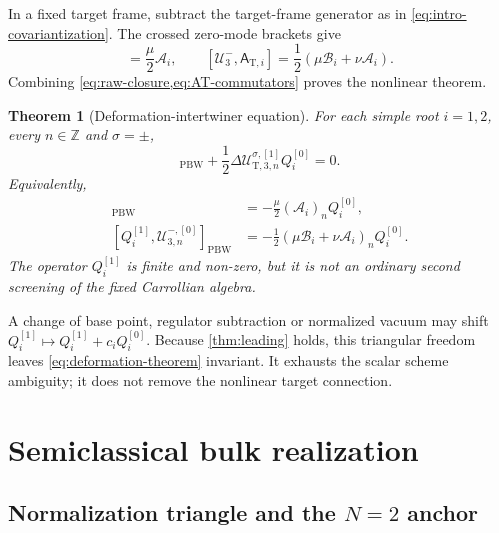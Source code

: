 \documentclass[11pt,a4paper]{article}
\numberwithin{equation}{section}
\newtheorem{theorem}{Theorem}[section]
\theoremstyle{remark}
\newcommand{\PBW}{\mathrm{PBW}}
\newcommand{\T}{\mathrm{T}}
\newcommand{\cU}{\mathcal U}
\newcommand{\cA}{\mathcal A}
\newcommand{\cB}{\mathcal B}
\begin{document}
In a fixed target frame, subtract the target-frame generator as in
\cref{eq:intro-covariantization}.  The crossed zero-mode brackets give
\begin{equation}
 [\cU_3^+,\mathsf A_{\T,i}]=\frac\mu2\cA_i,
 \qquad
 [\cU_3^-,\mathsf A_{\T,i}]=\frac12(\mu\cB_i+\nu\cA_i).
 \label{eq:AT-commutators}
\end{equation}
Combining \cref{eq:raw-closure,eq:AT-commutators} proves the nonlinear theorem.

\begin{theorem}[Deformation-intertwiner equation]
\label{thm:deformation}
For each simple root $i=1,2$, every $n\in\mathbb Z$ and $\sigma=\pm$,
\begin{equation}
 [Q_i^{[1]},\cU_{3,n}^{\sigma,[0]}]_{\PBW}
 +\frac12\Delta\cU_{\T,3,n}^{\sigma,[1]}Q_i^{[0]}=0.
 \label{eq:deformation-theorem}
\end{equation}
Equivalently,
\begin{align}
 [Q_i^{[1]},\cU_{3,n}^{+,[0]}]_{\PBW}
 &=-\frac\mu2(\cA_i)_nQ_i^{[0]},
 \label{eq:plus-deformation}\\
 [Q_i^{[1]},\cU_{3,n}^{-,[0]}]_{\PBW}
 &=-\frac12(\mu\cB_i+\nu\cA_i)_nQ_i^{[0]}.
 \label{eq:minus-deformation}
\end{align}
The operator $Q_i^{[1]}$ is finite and non-zero, but it is not an ordinary second screening of
the fixed Carrollian algebra.
\end{theorem}

A change of base point, regulator subtraction or normalized vacuum may shift
$Q_i^{[1]}\mapsto Q_i^{[1]}+c_iQ_i^{[0]}$.  Because \cref{thm:leading} holds, this triangular
freedom leaves \cref{eq:deformation-theorem} invariant.  It exhausts the scalar scheme
ambiguity; it does not remove the nonlinear target connection.

\section{Semiclassical bulk realization}
\label{sec:bulk}

\subsection{Normalization triangle and the \texorpdfstring{$N=2$}{N=2} anchor}
\end{document}
